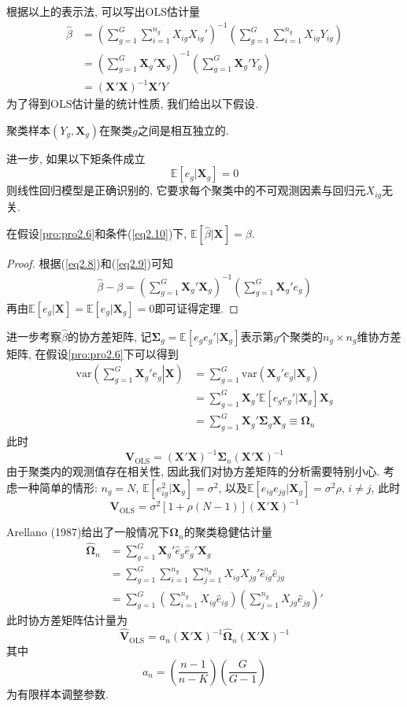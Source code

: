 \documentclass[cn, 12pt, math=mtpro2, bibstyle=apa, blue, twocol]{elegantbook}
\newcommand{\E}{\mathbb{E}}
\newcommand{\var}{\text{var}}
\newcommand{\X}{\mathbold{X}}
\newcommand{\hb}{\hat{\beta}}
\newcommand{\V}{\mathbold{V}}
\begin{document}
根据以上的表示法, 可以写出OLS估计量
\begin{align}
\hb&=\left(\sum_{g=1}^{G}\sum_{i=1}^{n_g}X_{ig}X_{ig}'\right)^{-1}\left(\sum_{g=1}^{G}\sum_{i=1}^{n_g}X_{ig}Y_{ig}\right) \nonumber \\
&=\left(\sum_{g=1}^{G}\X_g'\X_g\right)^{-1}\left(\sum_{g=1}^{G}\X_g'Y_g\right) \label{eq2.9} \\
&=(\X'\X)^{-1}\X'Y \nonumber
\end{align}
为了得到OLS估计量的统计性质, 我们给出以下假设.
\begin{proposition}\label{pro:pro2.6}
聚类样本$(Y_g,\X_g)$在聚类$g$之间是相互独立的.
\end{proposition}
进一步, 如果以下矩条件成立
\begin{equation}\label{eq2.10}
  \E[e_g|\X_g]=0
\end{equation}
则线性回归模型是正确识别的, 它要求每个聚类中的不可观测因素与回归元$X_{ig}$无关.
\begin{theorem}
  在假设\ref{pro:pro2.6}和条件(\ref{eq2.10})下, $\E[\hb|\X]=\beta$.
\end{theorem}
\begin{proof}
  根据(\ref{eq2.8})和(\ref{eq2.9})可知
  \begin{align*}
  \hb-\beta=\left(\sum_{g=1}^{G}\X_g'\X_g\right)^{-1}\left(\sum_{g=1}^{G}\X_g'e_g\right)
  \end{align*}
  再由$\E[e_g|\X]=\E[e_g|\X_g]=0$即可证得定理.
\end{proof}
进一步考察$\hb$的协方差矩阵, 记$\mathbold{\Sigma}_g=\E[e_ge_g'|\X_g]$表示第$g$个聚类的$n_g\times n_g$维协方差矩阵, 在假设\ref{pro:pro2.6}下可以得到
\begin{align}
\var\left(\left.\sum_{g=1}^{G}\X_g'e_g\right|\X\right)&=\sum_{g=1}^{G}\var(\X_g'e_g|\X_g) \nonumber \\
&=\sum_{g=1}^{G}\X_g'\E[e_ge_g'|\X_g]\X_g \nonumber \\
&=\sum_{g=1}^{G}\X_g'\mathbold{\Sigma}_g\X_g\equiv\mathbold{\Omega}_n \label{eq2.11}
\end{align}
此时
$$\V_{\text{OLS}}=(\X'\X)^{-1}\mathbold{\Sigma}_n(\X'\X)^{-1}$$
由于聚类内的观测值存在相关性, 因此我们对协方差矩阵的分析需要特别小心. 考虑一种简单的情形: $n_g=N$, $\E[e_{ig}^2|\X_g]=\sigma^2$, 以及$\E[e_{ig}e_{jg}|\X_g]=\sigma^2\rho$, $i\neq j$, 此时
$$\V_{\text{OLS}}=\sigma^2[1+\rho(N-1)](\X'\X)^{-1}$$

Arellano (1987)给出了一般情况下$\mathbold{\Omega}_n$的聚类稳健估计量
\begin{align*}
\hat{\mathbold{\Omega}}_n&=\sum_{g=1}^{G}\X_g'\hat{e}_g\hat{e}_g'\X_g \\
&=\sum_{g=1}^{G}\sum_{i=1}^{n_g}\sum_{j=1}^{n_g}X_{ig}X_{jg}'\hat{e}_{ig}\hat{e}_{jg} \\
&=\sum_{g=1}^{G}\left(\sum_{i=1}^{n_g}X_{ig}\hat{e}_{ig}\right)\left(\sum_{j=1}^{n_g}X_{jg}\hat{e}_{jg}\right)'
\end{align*}
此时协方差矩阵估计量为
$$\hat{\V}_{\text{OLS}}=a_n(\X'\X)^{-1}\hat{\mathbold{\Omega}}_n(\X'\X)^{-1}$$
其中
$$a_n=\left(\frac{n-1}{n-K}\right)\left(\frac{G}{G-1}\right)$$
为有限样本调整参数.
\end{document}
